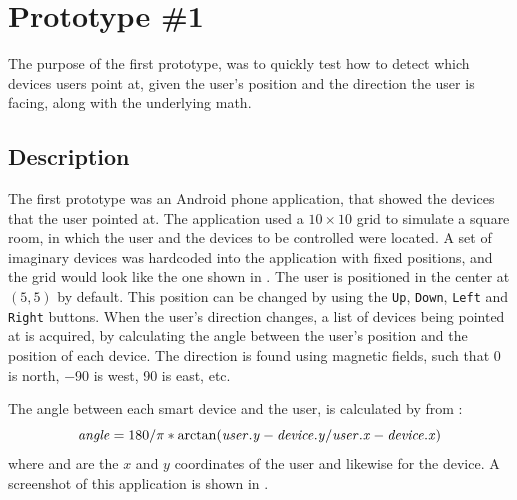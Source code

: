 \section{Prototype \#1}
\label{sec:implementation:prototypes:prototype1}
The purpose of the first prototype, 
was to quickly test how to detect which devices users point at, 
given the user's position and the direction the user is facing, 
along with the underlying math.

\subsection{Description}
The first prototype was an Android phone application, 
that showed the devices that the user pointed at.
The application used a $10 \times 10$ grid to simulate a square room, 
in which the user and the devices to be controlled were located.
A set of imaginary devices was hardcoded into the application with fixed positions, 
and the grid would look like the one shown in .
The user is positioned in the center at $(5,5)$ by default. 
This position can be changed by using the \texttt{Up}, \texttt{Down}, \texttt{Left} and \texttt{Right} buttons.
When the user's direction changes, 
a list of devices being pointed at is acquired, 
by calculating the angle between the user's position and the position of each device.
The direction is found using magnetic fields, 
such that \num{0} is north, \num{-90} is west, \num{90} is east, etc. 

The angle between each smart device and the user, 
is calculated by  from :
\begin{equation}
\var{angle} = 180 / \pi * \arctan(\var{user.y} - \var{device.y} / \var{user.x} - \var{device.x})
\end{equation}
where  and  are the $x$ and $y$ coordinates of the user and likewise for the device.
A screenshot of this application is shown in .

